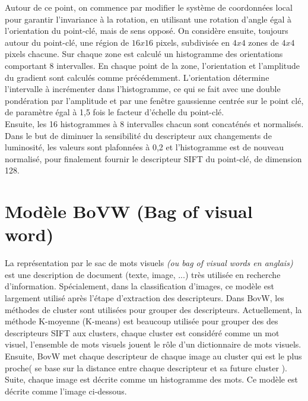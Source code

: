 Autour de ce point, on commence par modifier le système de coordonnées local pour garantir l'invariance à la rotation, en utilisant une rotation d'angle égal à l'orientation du point-clé, mais de sens opposé. On considère ensuite, toujours autour du point-clé, une région de $16x16$ pixels, subdivisée en $4x4$ zones de $4x4$ pixels chacune. Sur chaque zone est calculé un histogramme des orientations comportant 8 intervalles. En chaque point de la zone, l'orientation et l'amplitude du gradient sont calculés comme précédemment. L'orientation détermine l'intervalle à incrémenter dans l'histogramme, ce qui se fait avec une double pondération par l'amplitude et par une fenêtre gaussienne centrée sur le point clé, de paramètre égal à 1,5 fois le facteur d'échelle du point-clé\cite{low04}.\\

Ensuite, les 16 histogrammes à 8 intervalles chacun sont concaténés et normalisés. Dans le but de diminuer la sensibilité du descripteur aux changements de luminosité, les valeurs sont plafonnées à 0,2 et l'histogramme est de nouveau normalisé, pour finalement fournir le descripteur SIFT du point-clé, de dimension 128.

\section{Modèle BoVW (Bag of visual word)}
La représentation par le sac de mots visuels \textit{(ou bag of visual words en anglais)} est une description de document (texte, image, ...) très utilisée en recherche d'information. Spécialement, dans la classification d'images, ce modèle est largement utilisé après l'étape d'extraction des descripteurs. Dans BovW, les méthodes de cluster sont utilisées pour grouper des  descripteurs. Actuellement, la méthode K-moyenne (K-means)\cite{jm67} est beaucoup utilisée pour grouper des des descripteurs SIFT aux clusters, chaque cluster est considéré comme un mot visuel, l'ensemble de mots visuels jouent le rôle d'un dictionnaire de mots visuels. Ensuite, BovW met chaque descripteur de chaque image au cluster qui est le plus proche( se base sur la distance entre chaque descripteur et sa future cluster ). Suite, chaque image est décrite comme un histogramme des mots. Ce modèle est décrite comme l'image ci-dessous.

